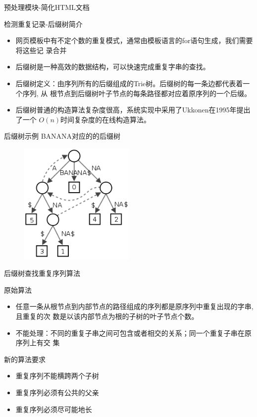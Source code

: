 \documentclass[presentation]{beamer}
\begin{document}
\begin{frame}[label=sec-2-6]{预处理模块-简化HTML文档}
\begin{block}{检测重复记录-后缀树简介}
\begin{itemize}
\item 网页模板中有不定个数的重复模式，通常由模板语言的for语句生成，我们需要将这些记
录合并
\item 后缀树是一种高效的数据结构，可以快速完成重复字串的查找。
\item 后缀树定义：由序列所有的后缀组成的Trie树。后缀树的每一条边都代表着一个序列, 从
根节点到后缀树叶子节点的每条路径都对应着原序列的一个后缀。
\item 后缀树普通的构造算法复杂度很高，系统实现中采用了Ukkonen在1995年提出了一个
  \(O(n)\)时间复杂度的在线构造算法。
\end{itemize}
\end{block}
\end{frame}

\begin{frame}[label=sec-2-7]{后缀树示例}
BANANA对应的的后缀树
\begin{figure}[hb]
\centering
\includegraphics[width=0.5\textwidth]{./suffix-tree-banana.png}
\end{figure}
\end{frame}

\begin{frame}[label=sec-2-8]{后缀树查找重复序列算法}
\begin{block}{原始算法}
\begin{itemize}
\item 任意一条从根节点到内部节点的路径组成的序列都是原序列中重复出现的字串,且重复的次
数是以该内部节点为根的子树的叶子节点个数。
\item 不能处理：不同的重复子串之间可包含或者相交的关系；同一个重复子串在原序列上有交
集
\end{itemize}
\end{block}

\begin{block}{新的算法要求}
\begin{itemize}
\item 重复序列不能横跨两个子树
\item 重复序列必须有公共的父亲
\item 重复序列必须尽可能地长
\end{itemize}
\end{block}
\end{frame}
\end{document}
